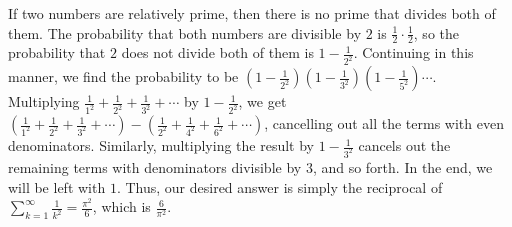 \documentclass[11pt]{article}
\begin{document}
\begin{solution}
If two numbers are relatively prime, then there is no prime that divides both of them. The probability that both numbers are divisible by $2$ is $\frac{1}{2} \cdot \frac{1}{2}$, so the probability that $2$ does not divide both of them is $1 - \frac{1}{2^2}$. Continuing in this manner, we find the probability to be $\left(1 - \frac{1}{2^2}\right)\left(1 - \frac{1}{3^2}\right)\left(1 - \frac{1}{5^2}\right) \cdots$. Multiplying $\frac{1}{1^2} + \frac{1}{2^2} + \frac{1}{3^2} + \cdots$ by $1 - \frac{1}{2^2}$, we get $(\frac{1}{1^2} + \frac{1}{2^2} + \frac{1}{3^2} + \cdots) - \left(\frac{1}{2^2} + \frac{1}{4^2} + \frac{1}{6^2} + \cdots\right)$, cancelling out all the terms with even denominators. Similarly, multiplying the result by $1 - \frac{1}{3^2}$ cancels out the remaining terms with denominators divisible by $3$, and so forth. In the end, we will be left with $1$. Thus, our desired answer is simply the reciprocal of $\sum\limits_{k = 1}^\infty \frac{1}{k^2} = \frac{\pi^2}{6}$, which is $\boxed{\frac{6}{\pi^2}}$.
\end{solution}
\end{document}
